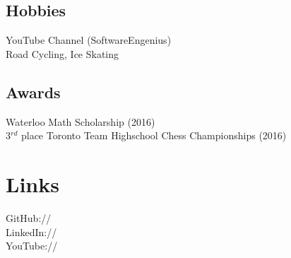 \documentclass[]{deedy-resume-openfont}
\begin{document}
\begin{minipage}[t]{0.33\textwidth}
\subsection{Hobbies}
YouTube Channel (SoftwareEngenius)\\
Road Cycling, Ice Skating\\

\vspace{2mm}

\subsection{Awards}


Waterloo Math Scholarship (2016) \\
3$^{rd}$ place Toronto Team Highschool Chess Championships (2016) \\

\vspace{1mm}


\section{Links} 
GitHub:// \href{https://github.com/MathBunny}{} \\
LinkedIn://  \href{https://www.linkedin.com/in/horatiulazu}{} \\
YouTube://  \href{https://www.youtube.com/user/SoftwareEngenius}{} \\
\sectionsep

%
%

\end{minipage} 
\end{document}
